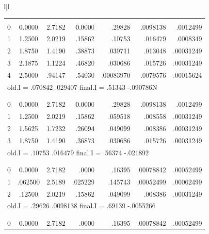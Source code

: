 \begin{figure}[H]
    \centering
    \tiny
    \setlength{\tabcolsep}{.4em}
    \begin{tabular}{l|l}
        \begin{tabular}{ccrrrrr}
            \Agrandheader \\
            0 & 0.0000 & 2.7182 & 0.0000 & .29828    & .0098138 & .0012499  \\
            1 & 1.2500 & 2.0219 & .15862 & .10753    & .016479  & .0008349  \\
            2 & 1.8750 & 1.4190 & .38873 & .039711   & .013048  & .00031249 \\
            3 & 2.1875 & 1.1224 & .46820 & .030686   & .015726  & .00031249 \\
            4 & 2.5000 & .94147 & .54030 & .00083970 & .0079576 & .00015624 \\
            \multicolumn{7}{l}{old.I = .070842 .029407 \hfill final.I = .51343 -.090786N} \\
        \\
            \Agrandheader \\
            0 & 0.0000 & 2.7182   & 0.0000   & .29828   & .0098138 & .0012499 \\
            1 & 1.2500 & 2.0219   & .15862   & .059518  & .008558  & .00031249\\
            2 & 1.5625 & 1.7232   & .26094   & .049099  & .008386  & .00031249\\
            3 & 1.8750 & 1.4190   & .36873   & .030686  & .015726  & .00031249\\
            \multicolumn{7}{l}{old.I = .10753 .016479 \hfill final.I = .56374 -.021892} \\
        \\
            \Agrandheader \\
            0 & 0.0000  & 2.7182 & .0000   & .16395  & .00078842 & .00052499 \\
            1 & .062500 & 2.5189 & .025229 & .145743 & .00052499 & .00062499 \\
            2 & .12500  & 2.0219 & .15862  & .049099 & .008386   & .00031249 \\
            \multicolumn{7}{l}{old.I = .29626 .0098138 \hfill final.I = .69139 -.0055266} \\
        \\
            \Agrandheader \\
            0 & 0.0000  & 2.7182 & .0000   & .16395  & .00078842 & .00052499 \\

\end{tabular}
\end{tabular}
\end{figure}

